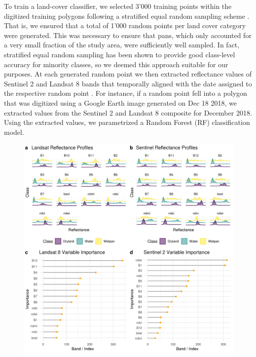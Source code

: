 \documentclass[abstract=off,10pt,a4paper,bibliography=totocnumbered]{article}
\begin{document}

To train a land-cover classifier, we selected 3'000 training points within the
digitized training polygons following a stratified equal random sampling scheme
\citep{Shetty.2021}. That is, we ensured that a total of 1'000 random points per
land cover category were generated. This was necessary to ensure that pans,
which only accounted for a very small fraction of the study area, were
sufficiently well sampled. In fact, stratified equal random sampling has been
shown to provide good class-level accuracy for minority classes, so we deemed
this approach suitable for our purposes. At each generated random point we then
extracted reflectance values of Sentinel 2 and Landsat 8 bands that temporally
aligned with the date assigned to the respective random point
. For instance, if a random point fell into a polygon that
was digitized using a Google Earth image generated on Dec 18 2018, we extracted
values from the Sentinel 2 and Landsat 8 composite for December 2018. Using the
extracted values, we parametrized a Random Forest (RF) classification model.

\begin{figure}[htbp]
 \begin{center}
  \includegraphics[width = \textwidth]{99_Reflectances.png}
  \caption{}
  \label{Reflectances}
 \end{center}
\end{figure}
\end{document}
